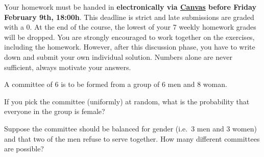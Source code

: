 \documentclass[a4paper,10pt,landscape,twocolumn]{scrartcl}
\newcommand\deadline{Friday February 9th, 18:00h}
\begin{document}
\homeworkproblems

{\sffamily\noindent
  Your homework must be handed in \textbf{electronically via
  \href{\canvasURL}{Canvas} before \deadline}. This deadline is strict and late
  submissions are graded with a 0. At the end of the course, the lowest of your
  7 weekly homework grades will be dropped. You are strongly encouraged to work
  together on the exercises, including the homework. However, after this
  discussion phase, you have to write down and submit your own individual
  solution. Numbers alone are never sufficient, always motivate your answers.
}

	
\begin{exercise}[Committees (3pt)]
  A committee of 6 is to be formed from a group of 6 men and 8 woman.

  \begin{subex}[1pt]
    If you pick the committee (uniformly) at random, what is the probability
    that everyone in the group is female?
  \end{subex}

  \begin{subex}[2pt]
    Suppose the committee should be balanced for gender (i.e.\ 3 men and 3
    women) and that two of the men refuse to serve together. How many different
    committees are possible?
  \end{subex}
\end{exercise}

\end{document}
